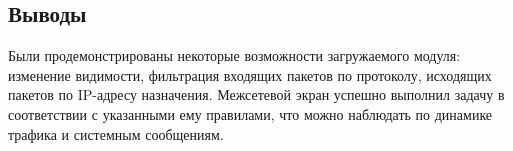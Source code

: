 \subsection{Выводы}
Были продемонстрированы некоторые возможности загружаемого модуля: изменение видимости, фильтрация входящих пакетов по протоколу, исходящих пакетов по IP-адресу назначения. Межсетевой экран успешно выполнил задачу в соответствии с указанными ему правилами, что можно наблюдать по динамике трафика и системным сообщениям.
